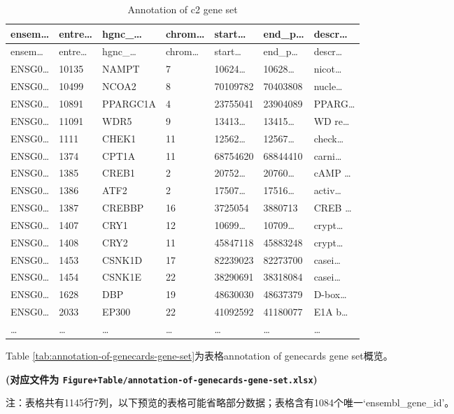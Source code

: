 \documentclass[
]{article}
\begin{document}
\begin{longtable}[]{@{}lllllll@{}}
\caption{\label{tab:annotation-of-c2-gene-set}Annotation of c2 gene set}\tabularnewline
\toprule
ensem\ldots{} & entre\ldots{} & hgnc\_\ldots{} & chrom\ldots{} & start\ldots{} & end\_p\ldots{} & descr\ldots{}\tabularnewline
\midrule
\endfirsthead
\toprule
ensem\ldots{} & entre\ldots{} & hgnc\_\ldots{} & chrom\ldots{} & start\ldots{} & end\_p\ldots{} & descr\ldots{}\tabularnewline
\midrule
\endhead
ENSG0\ldots{} & 10135 & NAMPT & 7 & 10624\ldots{} & 10628\ldots{} & nicot\ldots{}\tabularnewline
ENSG0\ldots{} & 10499 & NCOA2 & 8 & 70109782 & 70403808 & nucle\ldots{}\tabularnewline
ENSG0\ldots{} & 10891 & PPARGC1A & 4 & 23755041 & 23904089 & PPARG\ldots{}\tabularnewline
ENSG0\ldots{} & 11091 & WDR5 & 9 & 13413\ldots{} & 13415\ldots{} & WD re\ldots{}\tabularnewline
ENSG0\ldots{} & 1111 & CHEK1 & 11 & 12562\ldots{} & 12567\ldots{} & check\ldots{}\tabularnewline
ENSG0\ldots{} & 1374 & CPT1A & 11 & 68754620 & 68844410 & carni\ldots{}\tabularnewline
ENSG0\ldots{} & 1385 & CREB1 & 2 & 20752\ldots{} & 20760\ldots{} & cAMP \ldots{}\tabularnewline
ENSG0\ldots{} & 1386 & ATF2 & 2 & 17507\ldots{} & 17516\ldots{} & activ\ldots{}\tabularnewline
ENSG0\ldots{} & 1387 & CREBBP & 16 & 3725054 & 3880713 & CREB \ldots{}\tabularnewline
ENSG0\ldots{} & 1407 & CRY1 & 12 & 10699\ldots{} & 10709\ldots{} & crypt\ldots{}\tabularnewline
ENSG0\ldots{} & 1408 & CRY2 & 11 & 45847118 & 45883248 & crypt\ldots{}\tabularnewline
ENSG0\ldots{} & 1453 & CSNK1D & 17 & 82239023 & 82273700 & casei\ldots{}\tabularnewline
ENSG0\ldots{} & 1454 & CSNK1E & 22 & 38290691 & 38318084 & casei\ldots{}\tabularnewline
ENSG0\ldots{} & 1628 & DBP & 19 & 48630030 & 48637379 & D-box\ldots{}\tabularnewline
ENSG0\ldots{} & 2033 & EP300 & 22 & 41092592 & 41180077 & E1A b\ldots{}\tabularnewline
\ldots{} & \ldots{} & \ldots{} & \ldots{} & \ldots{} & \ldots{} & \ldots{}\tabularnewline
\bottomrule
\end{longtable}

Table \ref{tab:annotation-of-genecards-gene-set}为表格annotation of genecards gene set概览。

\textbf{(对应文件为 \texttt{Figure+Table/annotation-of-genecards-gene-set.xlsx})}

\begin{center}\begin{tcolorbox}[colback=gray!10, colframe=gray!50, width=0.9\linewidth, arc=1mm, boxrule=0.5pt]注：表格共有1145行7列，以下预览的表格可能省略部分数据；表格含有1084个唯一`ensembl\_gene\_id'。
\end{tcolorbox}
\end{center}
\end{document}
